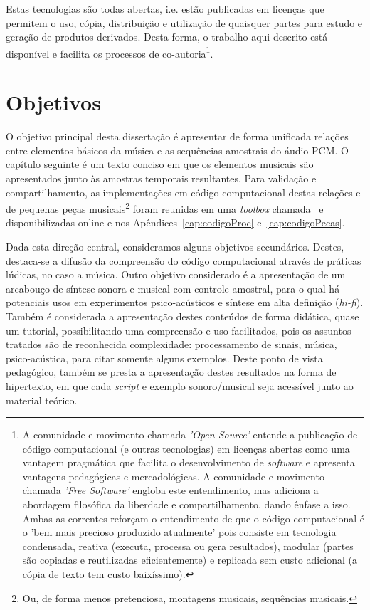 Estas tecnologias são todas abertas, i.e. estão publicadas em licenças que permitem o uso, cópia, distribuição e utilização de quaisquer partes para estudo e geração de produtos derivados. Desta forma, o trabalho aqui descrito está disponível e facilita os processos de co-autoria\footnote{A comunidade e movimento chamada \emph{'Open Source'} entende a publicação de código computacional (e outras tecnologias) em licenças abertas como uma vantagem pragmática que facilita o desenvolvimento de \emph{software} e apresenta vantagens pedagógicas e mercadológicas. A comunidade e movimento chamada \emph{'Free Software'} engloba este entendimento, mas adiciona a abordagem filosófica da liberdade e compartilhamento, dando ênfase a isso. Ambas as correntes reforçam o entendimento de que o código computacional é o 'bem mais precioso produzido atualmente' pois consiste em tecnologia condensada, reativa (executa, processa ou gera resultados), modular (partes são copiadas e reutilizadas eficientemente) e replicada sem custo adicional (a cópia de texto tem custo baixíssimo).\cite{Raymond,Lessig}}.

    \section{Objetivos}
   \label{sec:objetivos}
O objetivo principal desta dissertação é apresentar de forma unificada relações entre elementos básicos da música e as sequências amostrais do áudio PCM. O capítulo seguinte é um texto conciso em que os elementos musicais são apresentados junto às amostras temporais resultantes. Para validação e compartilhamento, as implementações em código computacional destas relações e de pequenas peças musicais\footnote{Ou, de forma menos pretenciosa, montagens musicais, sequências musicais.} foram reunidas em uma \emph{toolbox} chamada \massa\ e disponibilizadas online e nos Apêndices~\ref{cap:codigoProc} e~\ref{cap:codigoPecas}. 

Dada esta direção central, consideramos alguns objetivos secundários. Destes, destaca-se a difusão da compreensão do código computacional através de práticas lúdicas, no caso a música. Outro objetivo considerado é a apresentação de um arcabouço de síntese sonora e musical com controle amostral, para o qual há potenciais usos em experimentos psico-acústicos e síntese em alta definição (\emph{hi-fi}). Também é considerada a apresentação destes conteúdos de forma didática, quase um tutorial, possibilitando uma compreensão e uso facilitados, pois os assuntos tratados são de reconhecida complexidade: processamento de sinais, música, psico-acústica, para citar somente alguns exemplos. Deste ponto de vista pedagógico, também se presta a apresentação destes resultados na forma de hipertexto, em que cada \emph{script} e exemplo sonoro/musical seja acessível junto ao material teórico.
  
